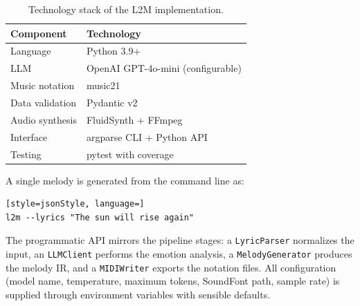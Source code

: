 \begin{table}[ht]
\centering
\caption[Technology stack]{Technology stack of the L2M implementation.}
\label{tab:tech-stack}
\begin{tabular}{l l}
\toprule
\textbf{Component} & \textbf{Technology} \\
\midrule
Language & Python 3.9+ \\
LLM & OpenAI GPT-4o-mini (configurable) \\
Music notation & music21 \\
Data validation & Pydantic v2 \\
Audio synthesis & FluidSynth + FFmpeg \\
Interface & argparse CLI + Python API \\
Testing & pytest with coverage \\
\bottomrule
\end{tabular}
\end{table}

A single melody is generated from the command line as:

\begin{lstlisting}[style=jsonStyle, language=]
l2m --lyrics "The sun will rise again"
\end{lstlisting}

\noindent
The programmatic API mirrors the pipeline stages: a \texttt{LyricParser}
normalizes the input, an \texttt{LLMClient} performs the emotion analysis,
a \texttt{MelodyGenerator} produces the melody IR, and a \texttt{MIDIWriter}
exports the notation files. All configuration (model name, temperature,
maximum tokens, SoundFont path, sample rate) is supplied through environment
variables with sensible defaults.
